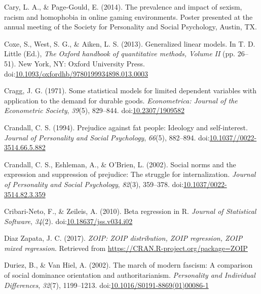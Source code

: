 \documentclass[english,,man]{apa6}
\begin{document}
\leavevmode\hypertarget{ref-cary2014prevalence}{}%
Cary, L. A., \& Page-Gould, E. (2014). The prevalence and impact of sexism, racism and homophobia in online gaming environments. Poster presented at the annual meeting of the Society for Personality and Social Psychology, Austin, TX.

\leavevmode\hypertarget{ref-coxe2013generalized}{}%
Coxe, S., West, S. G., \& Aiken, L. S. (2013). Generalized linear models. In T. D. Little (Ed.), \emph{The Oxford handbook of quantitative methods, Volume II} (pp. 26--51). New York, NY: Oxford University Press. doi:\href{https://doi.org/10.1093/oxfordhb/9780199934898.013.0003}{10.1093/oxfordhb/9780199934898.013.0003}

\leavevmode\hypertarget{ref-cragg1971some}{}%
Cragg, J. G. (1971). Some statistical models for limited dependent variables with application to the demand for durable goods. \emph{Econometrica: Journal of the Econometric Society}, \emph{39}(5), 829--844. doi:\href{https://doi.org/10.2307/1909582}{10.2307/1909582}

\leavevmode\hypertarget{ref-crandall1994prejudice}{}%
Crandall, C. S. (1994). Prejudice against fat people: Ideology and self-interest. \emph{Journal of Personality and Social Psychology}, \emph{66}(5), 882--894. doi:\href{https://doi.org/10.1037//0022-3514.66.5.882}{10.1037//0022-3514.66.5.882}

\leavevmode\hypertarget{ref-crandall2002social}{}%
Crandall, C. S., Eshleman, A., \& O'Brien, L. (2002). Social norms and the expression and suppression of prejudice: The struggle for internalization. \emph{Journal of Personality and Social Psychology}, \emph{82}(3), 359--378. doi:\href{https://doi.org/10.1037/0022-3514.82.3.359}{10.1037/0022-3514.82.3.359}

\leavevmode\hypertarget{ref-cribarineto2010beta}{}%
Cribari-Neto, F., \& Zeileis, A. (2010). Beta regression in R. \emph{Journal of Statistical Software}, \emph{34}(2). doi:\href{https://doi.org/10.18637/jss.v034.i02}{10.18637/jss.v034.i02}

\leavevmode\hypertarget{ref-zoip2017}{}%
Diaz Zapata, J. C. (2017). \emph{ZOIP: ZOIP distribution, ZOIP regression, ZOIP mixed regression}. Retrieved from \url{https://CRAN.R-project.org/package=ZOIP}

\leavevmode\hypertarget{ref-duriez2002march}{}%
Duriez, B., \& Van Hiel, A. (2002). The march of modern fascism: A comparison of social dominance orientation and authoritarianism. \emph{Personality and Individual Differences}, \emph{32}(7), 1199--1213. doi:\href{https://doi.org/10.1016/S0191-8869(01)00086-1}{10.1016/S0191-8869(01)00086-1}
\end{document}
